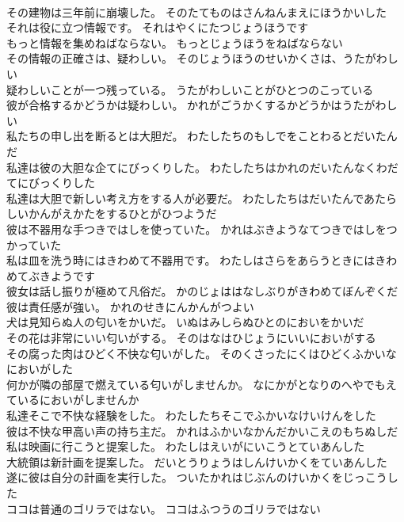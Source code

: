 \documentclass[8pt]{extreport}
\begin{document}
\begin{CJK}{UTF8}{min}
\\	その建物は三年前に崩壊した。	そのたてものはさんねんまえにほうかいした 
\\	それは役に立つ情報です。	それはやくにたつじょうほうです 
\\	もっと情報を集めねばならない。	もっとじょうほうをねばならない 
\\	その情報の正確さは、疑わしい。	そのじょうほうのせいかくさは、うたがわしい 
\\	疑わしいことが一つ残っている。	うたがわしいことがひとつのこっている 
\\	彼が合格するかどうかは疑わしい。	かれがごうかくするかどうかはうたがわしい 
\\	私たちの申し出を断るとは大胆だ。	わたしたちのもしでをことわるとだいたんだ 
\\	私達は彼の大胆な企てにびっくりした。	わたしたちはかれのだいたんなくわだてにびっくりした 
\\	私達は大胆で新しい考え方をする人が必要だ。	わたしたちはだいたんであたらしいかんがえかたをするひとがひつようだ 
\\	彼は不器用な手つきではしを使っていた。	かれはぶきようなてつきではしをつかっていた 
\\	私は皿を洗う時にはきわめて不器用です。	わたしはさらをあらうときにはきわめてぶきようです 
\\	彼女は話し振りが極めて凡俗だ。	かのじょははなしぶりがきわめてぼんぞくだ 
\\	彼は責任感が強い。	かれのせきにんかんがつよい 
\\	犬は見知らぬ人の匂いをかいだ。	いぬはみしらぬひとのにおいをかいだ 
\\	その花は非常にいい匂いがする。	そのはなはひじょうにいいにおいがする 
\\	その腐った肉はひどく不快な匂いがした。	そのくさったにくはひどくふかいなにおいがした 
\\	何かが隣の部屋で燃えている匂いがしませんか。	なにかがとなりのへやでもえているにおいがしませんか 
\\	私達そこで不快な経験をした。	わたしたちそこでふかいなけいけんをした 
\\	彼は不快な甲高い声の持ち主だ。	かれはふかいなかんだかいこえのもちぬしだ 
\\	私は映画に行こうと提案した。	わたしはえいがにいこうとていあんした 
\\	大統領は新計画を提案した。	だいとうりょうはしんけいかくをていあんした 
\\	遂に彼は自分の計画を実行した。	ついたかれはじぶんのけいかくをじっこうした 
\\	ココは普通のゴリラではない。	ココはふつうのゴリラではない 

\end{CJK}
\end{document}
